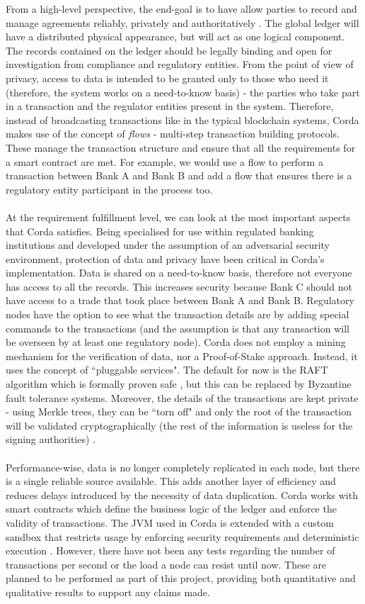 \documentclass[12pt,twoside]{article}
\begin{document}
From a high-level perspective, the end-goal is to have allow parties to record and manage agreements reliably, privately and authoritatively \cite{Corda:IP}. The global ledger will have a distributed physical appearance, but will act as one logical component. The records contained on the ledger should be legally binding and open for investigation from compliance and regulatory entities. From the point of view of privacy, access to data is intended to be granted only to those who need it (therefore, the system works on a need-to-know basis) - the parties who take part in a transaction and the regulator entities present in the system. Therefore, instead of broadcasting transactions like in the typical blockchain systems, Corda makes use of the concept of \textit{flows} - multi-step transaction building protocols. These manage the transaction structure and ensure that all the requirements for a smart contract are met. For example, we would use a flow to perform a transaction between Bank A and Bank B and add a flow that ensures there is a regulatory entity participant in the process too.
\\ \\
At the requirement fulfillment level, we can look at the most important aspects that Corda satisfies. Being specialised for use within regulated banking institutions and developed under the assumption of an adversarial security environment, protection of data and privacy have been critical in Corda's implementation. Data is shared on a need-to-know basis, therefore not everyone has access to all the records. This increases security because Bank C should not have access to a trade that took place between Bank A and Bank B. Regulatory nodes have the option to see what the transaction details are by adding special commands to the transactions (and the assumption is that any transaction will be overseen by at least one regulatory node). Corda does not employ a mining mechanism for the verification of data, nor a Proof-of-Stake approach. Instead, it uses the concept of ``pluggable services". The default for now is the RAFT algorithm which is formally proven safe \cite{raft}, but this can be replaced by Byzantine fault tolerance systems. Moreover, the details of the transactions are kept private - using Merkle trees, they can be ``torn off" and only the root of the transaction will be validated cryptographically (the rest of the information is useless for the signing authorities) \cite{Corda:TP}. 
\\ \\
Performance-wise, data is no longer completely replicated in each node, but there is a single reliable source available. This adds another layer of efficiency and reduces delays introduced by the necessity of data duplication. Corda works with smart contracts which define the business logic of the ledger and enforce the validity of transactions. The JVM used in Corda is extended with a custom sandbox that restricts usage by enforcing security requirements and deterministic execution \cite{Corda:IP}. However, there have not been any tests regarding the number of transactions per second or the load a node can resist until now. These are planned to be performed as part of this project, providing both quantitative and qualitative results to support any claims made.
\end{document}

